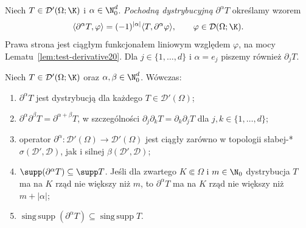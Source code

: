 \begin{definicja}
\label{def:dist-deriv20}
Niech $T\in\mathcal D'(\Omega;\K)$ i $\alpha\in\N_0^d$.
\emph{Pochodną dystrybucyjną} $\partial^\alpha T$ określamy wzorem
\[
 \langle\partial^\alpha T,\varphi\rangle
 =(-1)^{|\alpha|}\langle T,\partial^\alpha\varphi\rangle,
 \qquad\varphi\in\mathcal D(\Omega;\K).
\]
Prawa strona jest ciągłym funkcjonałem liniowym względem $\varphi$,
na mocy Lematu~\ref{lem:test-derivative20}.
Dla $j\in\{1,\ldots,d\}$ i $\alpha=e_j$ piszemy również $\partial_jT$.
\end{definicja}

\begin{twierdzenie}
\label{thm:dist-deriv-cont20}
Niech $T\in\mathcal D'(\Omega;\K)$ oraz
$\alpha,\beta\in\N_0^d$. Wówczas:
\begin{enumerate}
\item $\partial^\alpha T$ jest dystrybucją dla każdego
$T\in\mathcal D'(\Omega)$;
\item $\partial^\alpha\partial^\beta T
=\partial^{\alpha+\beta}T$, w szczególności
$\partial_j\partial_kT=\partial_k\partial_jT$
dla $j,k\in\{1,\ldots,d\}$;
\item operator $\partial^\alpha:\mathcal D'(\Omega)\to
\mathcal D'(\Omega)$ jest ciągły zarówno w topologii słabej-*
$\sigma(\mathcal D',\mathcal D)$, jak i silnej
$\beta(\mathcal D',\mathcal D)$;
\item $\supp(\partial^\alpha T)\subseteq\supp T$.
Jeśli dla zwartego $K\Subset\Omega$ i $m\in\N_0$
dystrybucja $T$ ma na $K$ rząd nie większy niż $m$,
to $\partial^\alpha T$ ma na $K$ rząd nie większy niż
$m+|\alpha|$;
\item $\operatorname{sing\,supp}(\partial^\alpha T)
\subseteq\operatorname{sing\,supp}T$.
\end{enumerate}
\end{twierdzenie}
